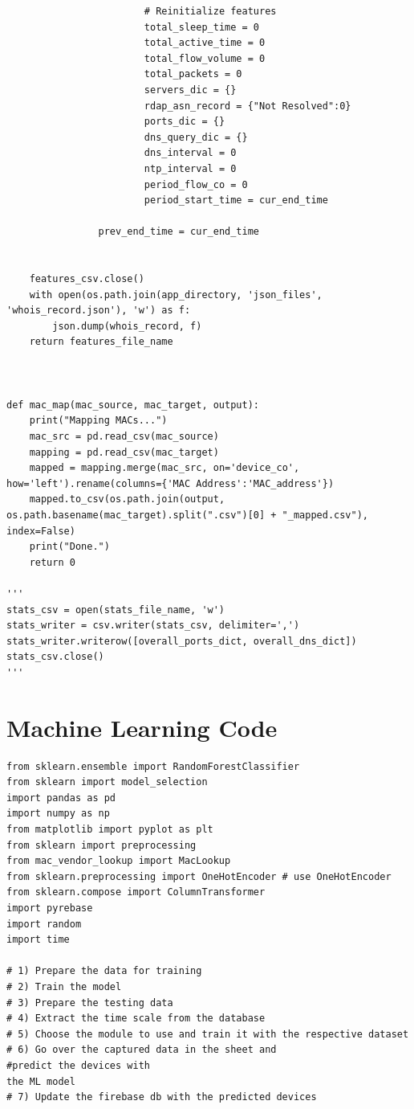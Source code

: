 \documentclass{article}
\begin{document}
\begin{appendices}
\begin{verbatim}
                        # Reinitialize features
                        total_sleep_time = 0
                        total_active_time = 0
                        total_flow_volume = 0
                        total_packets = 0
                        servers_dic = {}
                        rdap_asn_record = {"Not Resolved":0}
                        ports_dic = {}
                        dns_query_dic = {}
                        dns_interval = 0
                        ntp_interval = 0
                        period_flow_co = 0
                        period_start_time = cur_end_time

                prev_end_time = cur_end_time


    features_csv.close()
    with open(os.path.join(app_directory, 'json_files', 'whois_record.json'), 'w') as f:
        json.dump(whois_record, f)
    return features_file_name



def mac_map(mac_source, mac_target, output):
    print("Mapping MACs...")
    mac_src = pd.read_csv(mac_source)
    mapping = pd.read_csv(mac_target)
    mapped = mapping.merge(mac_src, on='device_co', how='left').rename(columns={'MAC Address':'MAC_address'})
    mapped.to_csv(os.path.join(output, os.path.basename(mac_target).split(".csv")[0] + "_mapped.csv"), index=False)
    print("Done.")
    return 0

'''
stats_csv = open(stats_file_name, 'w')
stats_writer = csv.writer(stats_csv, delimiter=',')
stats_writer.writerow([overall_ports_dict, overall_dns_dict])
stats_csv.close()
'''
\end{verbatim}

\section{Machine Learning Code}
\begin{verbatim}
from sklearn.ensemble import RandomForestClassifier
from sklearn import model_selection
import pandas as pd
import numpy as np
from matplotlib import pyplot as plt
from sklearn import preprocessing
from mac_vendor_lookup import MacLookup
from sklearn.preprocessing import OneHotEncoder # use OneHotEncoder
from sklearn.compose import ColumnTransformer
import pyrebase
import random 
import time 

# 1) Prepare the data for training
# 2) Train the model
# 3) Prepare the testing data
# 4) Extract the time scale from the database
# 5) Choose the module to use and train it with the respective dataset 
# 6) Go over the captured data in the sheet and 
#predict the devices with
the ML model
# 7) Update the firebase db with the predicted devices


\end{verbatim}
\end{appendices}
\end{document}

